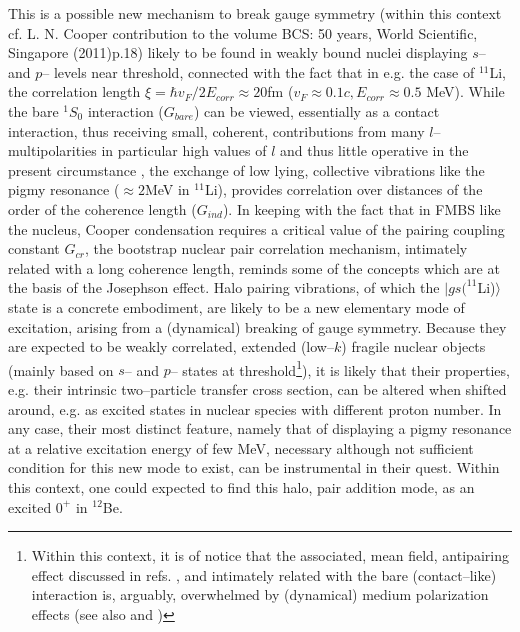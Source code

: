 \documentclass[a4paper,14pt]{book}
\begin{document}
This is a possible new mechanism to break gauge symmetry (within this context cf. L. N. Cooper contribution to the volume BCS: 50 years, World Scientific, Singapore (2011)p.18) likely to be found in weakly bound nuclei displaying $s$-- and $p$-- levels near threshold, connected with the fact that in e.g. the case of $^{11}$Li, the correlation length $\xi=\hbar v_F/2 E_{corr}\approx 20$fm ($v_F\approx 0.1 c, E_{corr}\approx 0.5$ MeV). While the bare $^1S_0$ interaction ($G_{bare}$) can be viewed, essentially as  a contact interaction, thus receiving small, coherent, contributions from many $l$--multipolarities in particular high values of $l$ and thus little operative in the present circumstance , the exchange of low lying, collective vibrations like the pigmy resonance ($\approx 2$MeV in $^{11}$Li), provides correlation over distances of the order of the coherence length ($G_{ind}$). In keeping with the fact that in FMBS like the nucleus, Cooper condensation requires a critical value of the pairing coupling constant $G_{cr}$, the bootstrap nuclear pair correlation mechanism, intimately related with a long coherence length, reminds some of the concepts which are at the basis of the Josephson effect. Halo pairing vibrations, of which the $|gs(^{11}$Li)$\rangle$ state is a concrete embodiment, are likely to be a new elementary mode of excitation, arising from a (dynamical) breaking of gauge symmetry. Because they are expected to be weakly correlated, extended (low--$k$) fragile nuclear objects (mainly based on $s$-- and $p$-- states at threshold\footnote{Within this context, it is of notice that the associated, mean field, antipairing effect discussed in refs. \cite{Hamamoto:03}, and intimately related with the bare (contact--like) interaction is, arguably, overwhelmed by (dynamical) medium polarization effects (see also \cite{Hamamoto:04} and \cite{Bennaceur:00})}), it is likely that their properties, e.g. their intrinsic two--particle transfer cross section, can be altered when shifted around, e.g. as excited states in nuclear species with different proton number. In any case, their most distinct feature, namely that of displaying a pigmy resonance at a relative excitation energy of few MeV, necessary although not sufficient condition for this new mode to exist, can be instrumental in their  quest.  Within this context, one could expected to find this halo, pair addition mode, as an excited $0^+$ in $^{12}$Be.
\end{document}
